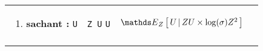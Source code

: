 \begin{tabularx}{\linewidth}{XXXX}
\begin{enumerate}
		                                                                                     \item \textbf{sachant :} \texttt{{U}}
	                                                                                     \end{enumerate} &
	\texttt{\esploisach{Z}}
	\texttt{{Z \times \log U}}
	\texttt{{U}}
	                                                                                   & $\esploisach{Z}{ ZU \times \log(\sigma)Z ^2}{U}$                                                                                                                                                \\ \\
	\bottomrule
\end{tabularx}

